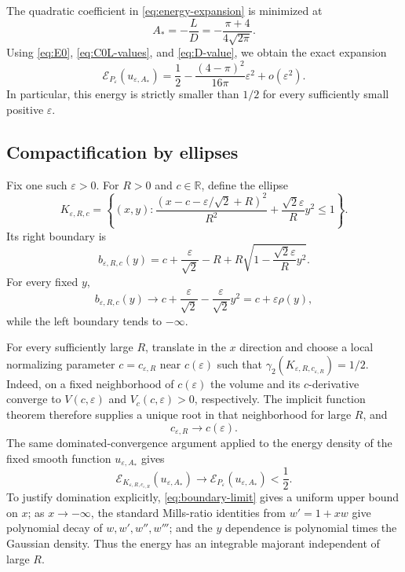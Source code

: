 \documentclass[11pt]{article}
\newcommand{\R}{\mathbb R}
\newcommand{\eps}{\varepsilon}
\begin{document}
The quadratic coefficient in \eqref{eq:energy-expansion} is minimized at
\begin{equation}\label{eq:Aopt}
 A_*=-\frac{L}{D}=-\frac{\pi+4}{4\sqrt{2\pi}}.
\end{equation}
Using \eqref{eq:E0}, \eqref{eq:C0L-values}, and \eqref{eq:D-value}, we obtain
the exact expansion
\begin{equation}\label{eq:negative}
 \mathcal E_{P_\eps}(u_{\eps,A_*})
 =\frac12-\frac{(4-\pi)^2}{16\pi}\eps^2+o(\eps^2).
\end{equation}
In particular, this energy is strictly smaller than $1/2$ for every
sufficiently small positive $\eps$.

\subsection*{Compactification by ellipses}

Fix one such $\eps>0$.  For $R>0$ and $c\in\R$, define the ellipse
\begin{equation}\label{eq:ellipse}
 K_{\eps,R,c}=\left\{(x,y):
 \frac{(x-c-\eps/\sqrt2+R)^2}{R^2}
 +\frac{\sqrt2\eps}{R}y^2\leq1\right\}.
\end{equation}
Its right boundary is
\[
 b_{\eps,R,c}(y)=c+\frac\eps{\sqrt2}-R
 +R\sqrt{1-\frac{\sqrt2\eps}{R}y^2}.
\]
For every fixed $y$,
\begin{equation}\label{eq:boundary-limit}
 b_{\eps,R,c}(y)\longrightarrow
 c+\frac\eps{\sqrt2}-\frac\eps{\sqrt2}y^2
 =c+\eps\rho(y),
\end{equation}
while the left boundary tends to $-\infty$.

For every sufficiently large $R$, translate in the $x$ direction and choose
a local normalizing parameter $c=c_{\eps,R}$ near $c(\eps)$ such that
$\gamma_2(K_{\eps,R,c_{\eps,R}})=1/2$.  Indeed, on a fixed neighborhood of
$c(\eps)$ the volume and its $c$-derivative converge to
$V(c,\eps)$ and $V_c(c,\eps)>0$, respectively.  The implicit function theorem
therefore supplies a unique root in that neighborhood for large $R$, and
\begin{equation}\label{eq:c-limit}
 c_{\eps,R}\longrightarrow c(\eps).
\end{equation}
The same dominated-convergence argument applied to the energy density of the
fixed smooth function $u_{\eps,A_*}$ gives
\begin{equation}\label{eq:energy-limit}
 \mathcal E_{K_{\eps,R,c_{\eps,R}}}(u_{\eps,A_*})
 \longrightarrow
 \mathcal E_{P_\eps}(u_{\eps,A_*})<\frac12.
\end{equation}
To justify domination explicitly, \eqref{eq:boundary-limit} gives a uniform
upper bound on $x$; as $x\to-\infty$, the standard Mills-ratio identities
from $w'=1+xw$ give polynomial decay of $w,w',w'',w'''$; and the $y$
dependence is polynomial times the Gaussian density.  Thus the energy has an
integrable majorant independent of large $R$.
\end{document}
